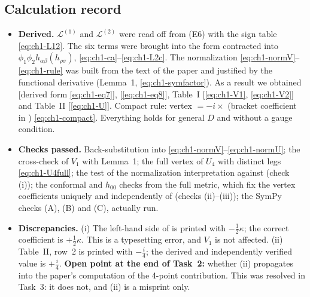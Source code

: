 \subsection{Calculation record}
\begin{itemize}[leftmargin=1.4em]
\item \textbf{Derived.} $\mathcal L^{(1)}$ and $\mathcal L^{(2)}$ were read off
from (E6) with the sign table \eqref{eq:ch1-L12}. The six terms were brought
into the form contracted into $\phi_1\phi_2h_{\alpha\beta}(h_{\rho\sigma})$,
\eqref{eq:ch1-ca}--\eqref{eq:ch1-L2c}. The normalization
\eqref{eq:ch1-normV}--\eqref{eq:ch1-rule} was built from the text of the paper
and justified by the functional derivative (Lemma~1,
\eqref{eq:ch1-symfactor}). As a result we obtained  [derived form
\eqref{eq:ch1-eq7}],  [\eqref{eq:ch1-eq8}], Table~I
[\eqref{eq:ch1-V1}, \eqref{eq:ch1-V2}] and Table~II [\eqref{eq:ch1-U}].
Compact rule: vertex $=-i\times$ (bracket coefficient in )
\eqref{eq:ch1-compact}. Everything holds for general $D$ and without a gauge
condition.
\item \textbf{Checks passed.} Back-substitution into
\eqref{eq:ch1-normV}--\eqref{eq:ch1-normU}; the cross-check of $V_1$ with
Lemma~1; the full vertex of $U_4$ with distinct legs \eqref{eq:ch1-U4full}; the
test of the normalization interpretation against  (check (i)); the
conformal and $h_{00}$ checks from the full metric, which fix the vertex
coefficients uniquely and independently of  (checks (ii)--(iii)); the
SymPy checks (A), (B) and (C), actually run.
\item \textbf{Discrepancies.} (i) The left-hand side of  is printed with
$-\tfrac12\kappa$; the correct coefficient is $+\tfrac12\kappa$. This is a
typesetting error, and $V_1$ is not affected. (ii) Table~II, row~2 is printed
with $-\tfrac i4$; the derived and independently verified value is $+\tfrac i4$.
\textbf{Open point at the end of Task~2:} whether (ii) propagates into the
paper's computation of the 4-point contribution. This was resolved in Task~3:
it does not, and (ii) is a misprint only.
\end{itemize}
